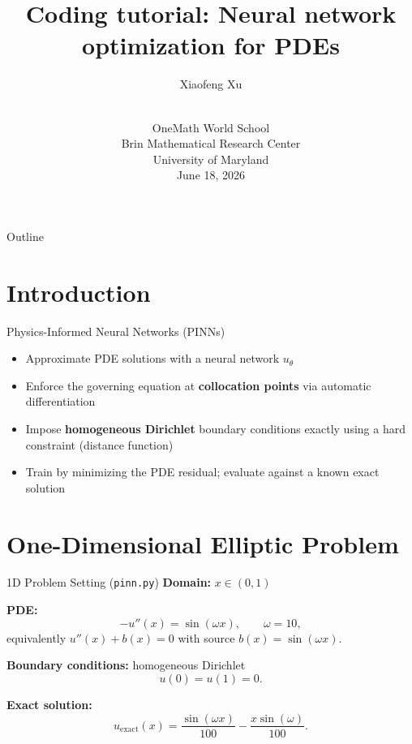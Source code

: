 \documentclass[10pt]{beamer}
\title[Operator Learning]{Coding tutorial: Neural network optimization for PDEs}
\author[X. Xu]{Xiaofeng Xu\\
	~\\
}
\institute[PSU]{Postdoctoral Scholar,\\
Department of Mathematics, Penn State University\\
}
\date[June 18]{OneMath World School \\
Brin Mathematical Research Center\\
University of Maryland\\
June 18, 2026}
\begin{document}
\begin{frame}
	\titlepage
	{
		\scriptsize
		
	}
\end{frame}

\begin{frame}{Outline}
	\tableofcontents
\end{frame}

\section{Introduction}

\begin{frame}{Physics-Informed Neural Networks (PINNs)}
	\begin{itemize}
		\item Approximate PDE solutions with a neural network $u_\theta$
		\item Enforce the governing equation at \textbf{collocation points} via automatic differentiation
		\item Impose \textbf{homogeneous Dirichlet} boundary conditions exactly using a hard constraint (distance function)
		\item Train by minimizing the PDE residual; evaluate against a known exact solution
	\end{itemize}
\end{frame}

\section{One-Dimensional Elliptic Problem}

\begin{frame}{1D Problem Setting (\texttt{pinn.py})}
	\textbf{Domain:} $x \in (0,1)$

	\vspace{0.4em}
	\textbf{PDE:}
	\[
		-u''(x) = \sin(\omega x), \qquad \omega = 10,
	\]
	equivalently $u''(x) + b(x) = 0$ with source $b(x) = \sin(\omega x)$.

	\vspace{0.4em}
	\textbf{Boundary conditions:} homogeneous Dirichlet
	\[
		u(0) = u(1) = 0.
	\]

	\vspace{0.4em}
	\textbf{Exact solution:}
	\[
		u_{\mathrm{exact}}(x)
		= \frac{\sin(\omega x)}{100} - \frac{x\sin(\omega)}{100}.
	\]
\end{frame}
\end{document}
